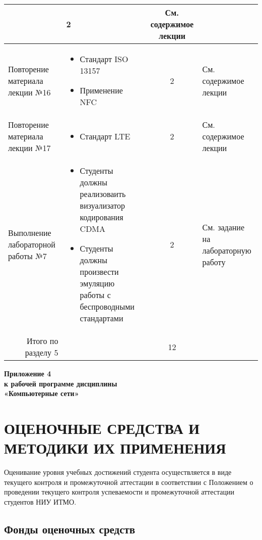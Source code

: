 \begin{landscape}
\begin{center}
\begin{longtable}{|p{}|p{}|c|p{}|}
\begin{itemize}
\end{itemize} & 2 & См. содержимое лекции\\\hline
Повторение материала лекции №16 & \begin{itemize}
\item Стандарт ISO 13157\item Применение NFC
\end{itemize} & 2 & См. содержимое лекции\\\hline
Повторение материала лекции №17 & \begin{itemize}
\item Стандарт LTE
\end{itemize} & 2 & См. содержимое лекции\\\hline
Выполнение лабораторной работы №7 & \begin{itemize}
\item Студенты должны реализоваить визуализатор кодирования CDMA\item Студенты должны произвести эмуляцию работы с беспроводными стандартами
\end{itemize} & 2 & См. задание на лабораторную работу\\\hline
\multicolumn{1}{|r|}{Итого по разделу 5} &  & 12 & \\\hline

\end{longtable}
\end{center}

\end{landscape}


\newpage
\pagestyle{plain}
\begin{flushright}
\textbf{Приложение 4\\
к рабочей программе дисциплины\\
«Компьютерные сети»}
\end{flushright}

\section*{ОЦЕНОЧНЫЕ СРЕДСТВА И МЕТОДИКИ ИХ ПРИМЕНЕНИЯ}

Оценивание уровня учебных достижений студента осуществляется в виде текущего контроля и промежуточной аттестации в соответствии с Положением о проведении текущего контроля успеваемости и промежуточной аттестации студентов НИУ ИТМО.

\subsection*{Фонды оценочных средств}

